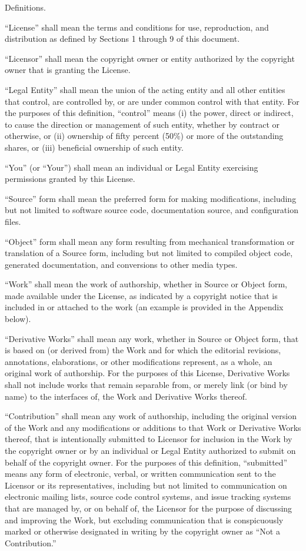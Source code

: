 \documentclass{article}
\begin{document}
  Definitions.

  ``License'' shall mean the terms and conditions for use,
  reproduction, and distribution as defined by Sections 1 through 9
  of this document.

  ``Licensor'' shall mean the copyright owner or entity authorized by
  the copyright owner that is granting the License.

  ``Legal Entity'' shall mean the union of the acting entity and all
  other entities that control, are controlled by, or are under common
  control with that entity. For the purposes of this definition,
  ``control'' means (i) the power, direct or indirect, to cause the
  direction or management of such entity, whether by contract or
  otherwise, or (ii) ownership of fifty percent (50\%) or more of the
  outstanding shares, or (iii) beneficial ownership of such entity.

  ``You'' (or ``Your'') shall mean an individual or Legal Entity
  exercising permissions granted by this License.

  ``Source'' form shall mean the preferred form for making
  modifications, including but not limited to software source code,
  documentation source, and configuration files.

  ``Object'' form shall mean any form resulting from mechanical
  transformation or translation of a Source form, including but not
  limited to compiled object code, generated documentation, and
  conversions to other media types.

  ``Work'' shall mean the work of authorship, whether in Source or
  Object form, made available under the License, as indicated by a
  copyright notice that is included in or attached to the work (an
  example is provided in the Appendix below).

  ``Derivative Works'' shall mean any work, whether in Source or
  Object form, that is based on (or derived from) the Work and for
  which the editorial revisions, annotations, elaborations, or other
  modifications represent, as a whole, an original work of
  authorship. For the purposes of this License, Derivative Works
  shall not include works that remain separable from, or merely link
  (or bind by name) to the interfaces of, the Work and Derivative
  Works thereof.

  ``Contribution'' shall mean any work of authorship, including the
  original version of the Work and any modifications or additions to
  that Work or Derivative Works thereof, that is intentionally
  submitted to Licensor for inclusion in the Work by the copyright
  owner or by an individual or Legal Entity authorized to submit on
  behalf of the copyright owner. For the purposes of this definition,
  ``submitted'' means any form of electronic, verbal, or written
  communication sent to the Licensor or its representatives,
  including but not limited to communication on electronic mailing
  lists, source code control systems, and issue tracking systems that
  are managed by, or on behalf of, the Licensor for the purpose of
  discussing and improving the Work, but excluding communication that
  is conspicuously marked or otherwise designated in writing by the
  copyright owner as ``Not a Contribution.''
\end{document}
